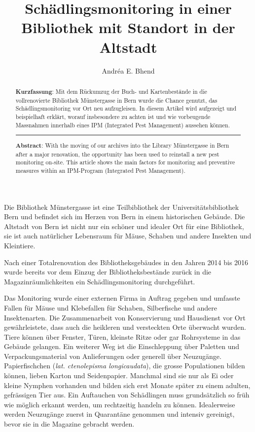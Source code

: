 \documentclass[a4paper,
fontsize=11pt,
oneside,
numbers=noperiodatend,
parskip=half-,
bibliography=totoc,
final
]{scrartcl}
\title{\LARGE{Schädlingsmonitoring in einer Bibliothek mit Standort in der Altstadt}}%
\author{Andréa E. Bhend} %
\date{}
\begin{document}
\maketitle
\thispagestyle{fancyplain} 

\begin{abstract}
\noindent
\textbf{Kurzfassung}: Mit dem Rückumzug der Buch- und Kartenbestände in
die vollrenovierte Bibliothek Münstergasse in Bern wurde die Chance
genutzt, das Schädlingsmonitoring vor Ort neu aufzugleisen. In diesem
Artikel wird aufgezeigt und beispielhaft erklärt, worauf insbesondere zu
achten ist und wie vorbeugende Massnahmen innerhalb eines IPM
(Integrated Pest Management) aussehen können.

\begin{center}\rule{0.5\linewidth}{0.5pt}\end{center}

\textbf{Abstract}: With the moving of our archives into the Library
Münstergasse in Bern after a major renovation, the opportunity has been
used to reinstall a new pest monitoring on-site. This article shows the
main factors for monitoring and preventive measures within an
IPM-Program (Integrated Pest Management).
\end{abstract}

Die Bibliothek Münstergasse ist eine Teilbibliothek der
Universitätsbibliothek Bern und befindet sich im Herzen von Bern in
einem historischen Gebäude. Die Altstadt von Bern ist nicht nur ein
schöner und idealer Ort für eine Bibliothek, sie ist auch natürlicher
Lebensraum für Mäuse, Schaben und andere Insekten und Kleintiere.

Nach einer Totalrenovation des Bibliotheksgebäudes in den Jahren 2014
bis 2016 wurde bereits vor dem Einzug der Bibliotheksbestände zurück in
die Magazinräumlichkeiten ein Schädlingsmonitoring durchgeführt.

Das Monitoring wurde einer externen Firma in Auftrag gegeben und
umfasste Fallen für Mäuse und Klebefallen für Schaben, Silberfische und
andere Insektenarten. Die Zusammenarbeit von Konservierung und
Hausdienst vor Ort gewährleistete, dass auch die heikleren und
versteckten Orte überwacht wurden. Tiere können über Fenster, Türen,
kleinste Ritze oder gar Rohrsysteme in das Gebäude gelangen. Ein
weiterer Weg ist die Einschleppung über Paletten und Verpackungsmaterial
von Anlieferungen oder generell über Neuzugänge. Papierfischchen
(\emph{lat. ctenolepisma longicaudata}), die grosse Populationen bilden
können, lieben Karton und Seidenpapier. Manchmal sind sie nur als Ei
oder kleine Nymphen vorhanden und bilden sich erst Monate später zu
einem adulten, gefrässigen Tier aus. Ein Auftauchen von Schädlingen muss
grundsätzlich so früh wie möglich erkannt werden, um rechtzeitig handeln
zu können. Idealerweise werden Neuzugänge zuerst in Quarantäne genommen
und intensiv gereinigt, bevor sie in die Magazine gebracht werden.
\end{document}
